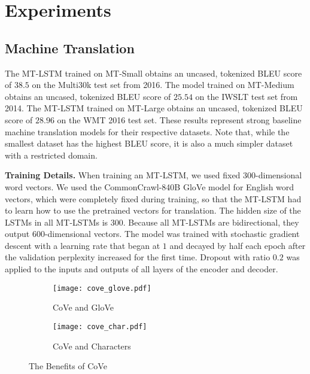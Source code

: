 \section{Experiments}
\subsection{Machine Translation}
The MT-LSTM trained on MT-Small obtains an uncased,
tokenized BLEU score of $38.5$ on the Multi30k test set from 2016.
The model trained on MT-Medium obtains an uncased, 
tokenized BLEU score of $25.54$ on the IWSLT test set from 2014.
The MT-LSTM trained on MT-Large obtains an uncased, 
tokenized BLEU score of $28.96$ on the WMT 2016 test set.
These results represent strong baseline machine translation models for their respective datasets. 
Note that, while the smallest dataset has the highest BLEU score, 
it is also a much simpler dataset with a restricted domain.

\textbf{Training Details. } 
When training an MT-LSTM,
we used fixed 300-dimensional word vectors.
We used the CommonCrawl-840B GloVe model for English word vectors,
which were completely fixed during training,
so that the MT-LSTM had to learn how to use the pretrained vectors for translation.
The hidden size of the LSTMs in all MT-LSTMs is 300. 
Because all MT-LSTMs are bidirectional,
they output 600-dimensional vectors.
The model was trained with stochastic gradient descent with a learning rate that began at $1$ and decayed by half each epoch after the validation perplexity increased for the first time.
Dropout with ratio $0.2$ was applied to the inputs and outputs of all layers of the encoder and decoder.

\begin{figure}
\begin{subfigure}{0.48\textwidth}
\texttt{[image: cove\_glove.pdf]}\vspace{-0.2cm}
\caption{CoVe and GloVe} \label{fig:coveGloVe}
\end{subfigure}
\hspace*{\fill} %
\begin{subfigure}{0.48\textwidth}
\texttt{[image: cove\_char.pdf]}\vspace{-0.2cm}
\caption{CoVe and Characters} \label{fig:coveChar}
\end{subfigure}
\caption{The Benefits of CoVe} \label{fig:bars}
\end{figure}


